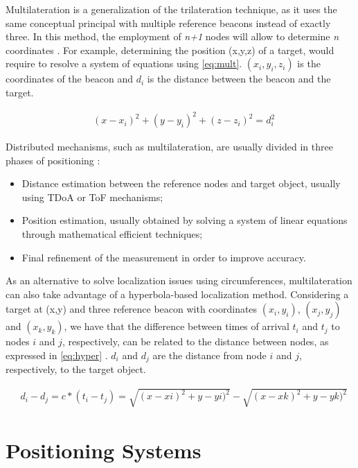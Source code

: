 Multilateration is a generalization of the trilateration technique, as it uses the same conceptual principal with multiple reference beacons instead of exactly three. In this method, the employment of \textit{n+1} nodes will allow to determine \textit{n} coordinates \cite{arch_localiz}. For example, determining the position (x,y,z) of a target, would require to resolve a system of equations using \ref{eq:mult}. $(x_{i}, y_{i}, z_{i})$ is the coordinates of the beacon and $d_{i}$ is the distance between the beacon and the target.

\begin{eqnarray}
& (x - x_{i})^2 + (y - y_{i})^2 + (z - z_{i})^2 = d_{i}^2 
\label{eq:mult}
\end{eqnarray}

Distributed mechanisms, such as multilateration, are usually divided in three phases of positioning \cite{suvey-loc}:
\begin{itemize}
	\item Distance estimation between the reference nodes and target object, usually using TDoA or ToF mechanisms;
	\item Position estimation, usually obtained by solving a system of linear equations through mathematical efficient techniques;
	\item Final refinement of the measurement in order to improve accuracy.
\end{itemize}

As an alternative to solve localization issues using circumferences, multilateration can also take advantage of a hyperbola-based localization method. Considering a target at (x,y) and three reference beacon with coordinates $(x_{i},y_{i})$,  $(x_{j},y_{j})$ and  $(x_{k},y_{k})$, we have that the difference between times of arrival $t_{i}$ and $t_{j}$ to nodes $i$ and $j$, respectively, can be related to the distance between nodes, as expressed in \ref{eq:hyper} \cite{arch_localiz}. $d_{i}$ and $d_{j}$ are the distance from node $i$ and $j$, respectively, to the target object. 

\begin{eqnarray}
& d_{i} - d_{j} = c * (t_{i} - t_{j}) = \sqrt{(x - x{i})^2 + y - y{i})^2} - \sqrt{(x - x{k})^2 + y - y{k})^2}
\label{eq:hyper}
\end{eqnarray}


\section{Positioning Systems}

